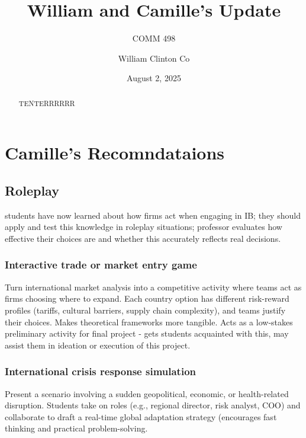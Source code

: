 \documentclass[
  11pt,
]{article}
\title{William and Camille's Update}
\subtitle{COMM 498}
\author{William Clinton Co}
\date{August 2, 2025}
\renewcommand*\contentsname{Table of contents}
\newcommand\contentsname{Table of contents}
\begin{document}
\maketitle
\begin{abstract}
TENTERRRRRR
\end{abstract}

\renewcommand*\contentsname{Table of contents}
{
\hypersetup{linkcolor=}
\setcounter{tocdepth}{3}
\tableofcontents
}

\section{Camille's Recomndataions}\label{camilles-recomndataions}

\subsection{Roleplay}\label{roleplay}

students have now learned about how firms act when engaging in IB; they
should apply and test this knowledge in roleplay situations; professor
evaluates how effective their choices are and whether this accurately
reflects real decisions.

\subsubsection{Interactive trade or market entry
game}\label{interactive-trade-or-market-entry-game}

Turn international market analysis into a competitive activity where
teams act as firms choosing where to expand. Each country option has
different risk-reward profiles (tariffs, cultural barriers, supply chain
complexity), and teams justify their choices. Makes theoretical
frameworks more tangible. Acts as a low-stakes preliminary activity for
final project - gets students acquainted with this, may assist them in
ideation or execution of this project.

\subsubsection{International crisis response
simulation}\label{international-crisis-response-simulation}

Present a scenario involving a sudden geopolitical, economic, or
health-related disruption. Students take on roles (e.g., regional
director, risk analyst, COO) and collaborate to draft a real-time global
adaptation strategy (encourages fast thinking and practical
problem-solving.
\end{document}
